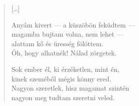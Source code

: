 \documentclass[11pt]{extbook}
\newcommand*{\centeredornament}{\centerline{\pgfornament[width=6cm]{88}}}
\begin{document}
\newpage

\vspace*{-15mm}
\centeredornament


\poemtitle*{\phantom{Gyermekké tettél}}

\begin{verse}
  \textnormal{[\ldots]}

  Anyám kivert --- a küszöbön feküdtem --- \\
  magamba bujtam volna, nem lehet --- \\
  alattam kő és üresség fölöttem. \\
  Óh, hogy alhatnék! Nálad zörgetek.

  Sok ember él, ki érzéketlen, mint én, \\
  kinek szeméből mégis könny ered. \\
  Nagyon szeretlek, hisz magamat szintén \\
  nagyon meg tudtam szeretni veled.
\end{verse}

\newpage


\vspace*{-15mm}
\centeredornament


\end{document}
